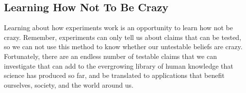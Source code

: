 \subsection{Learning How Not To Be Crazy}
Learning about how experiments work is an opportunity to learn how not be crazy. Remember, experiments can only tell us about claims that can be tested, so we can not use this method to know whether our untestable beliefs are crazy. Fortunately, there are an endless number of testable claims that we can investigate that can add to the evergrowing library of human knowledge that science has produced so far, and be translated to applications that benefit ourselves, society, and the world around us.
